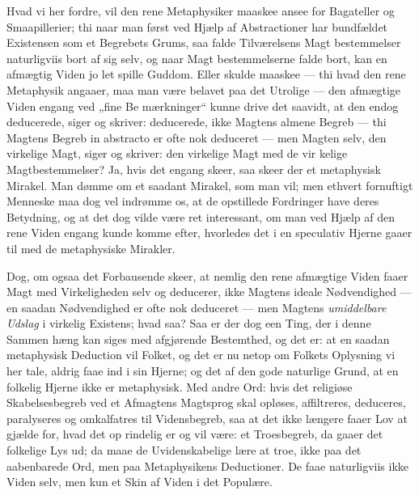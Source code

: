 \documentclass[12pt]{book}
\newcommand{\opage}[1]{\marginnote{\footnotesize\textit{[#1]}}}
\begin{document}
Hvad vi her fordre, vil den rene Metaphysiker maaskee
ansee for Bagateller og Smaapillerier; thi naar man først
ved Hjælp af Abstractioner har bundfældet Existensen
som et Begrebets Grums, saa falde Tilværelsens Magt\-%
bestemmelser naturligviis bort af sig selv, og naar Magt\-%
bestemmelserne falde bort, kan en afmægtig Viden jo let
spille Guddom. Eller skulde maaskee --- thi hvad den
rene Metaphysik angaaer, maa man være belavet paa det
Utrolige --- den afmægtige Viden engang ved „fine Be\-%
mærkninger“ kunne drive det saavidt, at den endog
deducerede, siger og skriver: deducerede, ikke Magtens
almene Begreb --- thi Magtens Begreb in abstracto er
ofte nok deduceret --- men Magten selv, den virkelige
Magt, siger og skriver: den virkelige Magt med de vir\-%
kelige Magtbestemmelser? Ja, hvis det engang skeer,
saa skeer der et metaphysisk Mirakel. Man dømme om
et saadant Mirakel, som man vil; men ethvert fornuftigt
Menneske maa dog vel indrømme os, at de opstillede
Fordringer have deres Betydning, og at det dog vilde
\opage{145}\setcounter{footnote}{0}%
være ret interessant, om man ved Hjælp af den rene
Viden engang kunde komme efter, hvorledes det i en
speculativ Hjerne gaaer til med de metaphysiske
Mirakler.

Dog, om ogsaa det Forbausende skeer, at nemlig
den rene afmægtige Viden faaer Magt med Virkeligheden
selv og deducerer, ikke Magtens ideale Nødvendighed ---
en saadan Nødvendighed er ofte nok deduceret --- men
Magtens \textit{umiddelbare Udslag} i virkelig Existens; hvad
saa? Saa er der dog een Ting, der i denne Sammen\-%
hæng kan siges med afgjørende Bestemthed, og det er:
at en saadan metaphysisk Deduction vil Folket, og det
er nu netop om Folkets Oplysning vi her tale, aldrig
faae ind i sin Hjerne; og det af den gode naturlige
Grund, at en folkelig Hjerne ikke er metaphysisk. Med
andre Ord: hvis det religiøse Skabelsesbegreb ved et
Afmagtens Magtsprog skal opløses, affiltreres, deduceres,
paralyseres og omkalfatres til Vidensbegreb, saa at det
ikke længere faaer Lov at gjælde for, hvad det op\-%
rindelig er og vil være: et Troesbegreb, da gaaer det
folkelige Lys ud; da maae de Uvidenskabelige lære at troe,
ikke paa det aabenbarede Ord, men paa Metaphysikens
Deductioner. De faae naturligviis ikke Viden selv, men
kun et Skin af Viden i det Populære.
\end{document}
